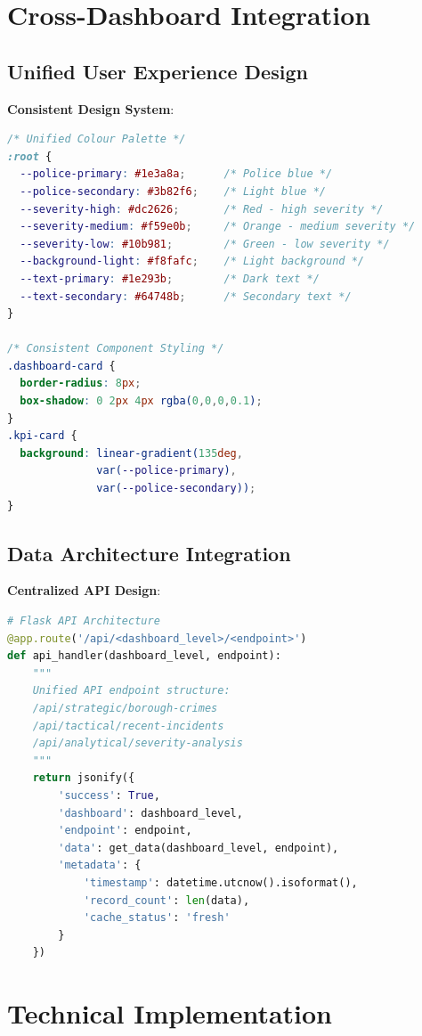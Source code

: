 \documentclass[12pt,a4paper]{article}
\begin{document}
\section{Cross-Dashboard Integration}

\subsection{Unified User Experience Design}

\textbf{Consistent Design System}:
\begin{lstlisting}[language=CSS]
/* Unified Colour Palette */
:root {
  --police-primary: #1e3a8a;      /* Police blue */
  --police-secondary: #3b82f6;    /* Light blue */
  --severity-high: #dc2626;       /* Red - high severity */
  --severity-medium: #f59e0b;     /* Orange - medium severity */
  --severity-low: #10b981;        /* Green - low severity */
  --background-light: #f8fafc;    /* Light background */
  --text-primary: #1e293b;        /* Dark text */
  --text-secondary: #64748b;      /* Secondary text */
}

/* Consistent Component Styling */
.dashboard-card { 
  border-radius: 8px; 
  box-shadow: 0 2px 4px rgba(0,0,0,0.1); 
}
.kpi-card { 
  background: linear-gradient(135deg, 
              var(--police-primary), 
              var(--police-secondary)); 
}
\end{lstlisting}

\subsection{Data Architecture Integration}

\textbf{Centralized API Design}:
\begin{lstlisting}[language=Python]
# Flask API Architecture
@app.route('/api/<dashboard_level>/<endpoint>')
def api_handler(dashboard_level, endpoint):
    """
    Unified API endpoint structure:
    /api/strategic/borough-crimes
    /api/tactical/recent-incidents  
    /api/analytical/severity-analysis
    """
    return jsonify({
        'success': True,
        'dashboard': dashboard_level,
        'endpoint': endpoint,
        'data': get_data(dashboard_level, endpoint),
        'metadata': {
            'timestamp': datetime.utcnow().isoformat(),
            'record_count': len(data),
            'cache_status': 'fresh'
        }
    })
\end{lstlisting}

\section{Technical Implementation}
\end{document}
